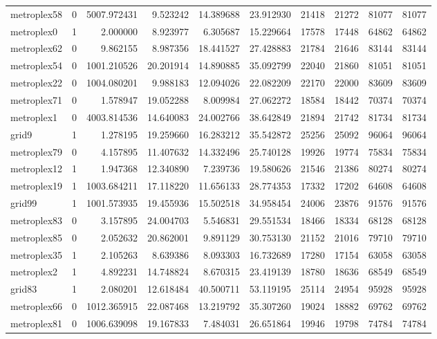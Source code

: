 \begin{longtable}{|l|r|r|r|r|r|r|r|r|r|}
metroplex58 & 0 & 5007.972431 & 9.523242 & 14.389688 & 23.912930 & 21418 & 21272 & 81077 & 81077 \\
metroplex0 & 1 & 2.000000 & 8.923977 & 6.305687 & 15.229664 & 17578 & 17448 & 64862 & 64862 \\
metroplex62 & 0 & 9.862155 & 8.987356 & 18.441527 & 27.428883 & 21784 & 21646 & 83144 & 83144 \\
metroplex54 & 0 & 1001.210526 & 20.201914 & 14.890885 & 35.092799 & 22040 & 21860 & 81051 & 81051 \\
metroplex22 & 0 & 1004.080201 & 9.988183 & 12.094026 & 22.082209 & 22170 & 22000 & 83609 & 83609 \\
metroplex71 & 0 & 1.578947 & 19.052288 & 8.009984 & 27.062272 & 18584 & 18442 & 70374 & 70374 \\
metroplex1 & 0 & 4003.814536 & 14.640083 & 24.002766 & 38.642849 & 21894 & 21742 & 81734 & 81734 \\
grid9 & 1 & 1.278195 & 19.259660 & 16.283212 & 35.542872 & 25256 & 25092 & 96064 & 96064 \\
metroplex79 & 0 & 4.157895 & 11.407632 & 14.332496 & 25.740128 & 19926 & 19774 & 75834 & 75834 \\
metroplex12 & 1 & 1.947368 & 12.340890 & 7.239736 & 19.580626 & 21546 & 21386 & 80274 & 80274 \\
metroplex19 & 1 & 1003.684211 & 17.118220 & 11.656133 & 28.774353 & 17332 & 17202 & 64608 & 64608 \\
grid99 & 1 & 1001.573935 & 19.455936 & 15.502518 & 34.958454 & 24006 & 23876 & 91576 & 91576 \\
metroplex83 & 0 & 3.157895 & 24.004703 & 5.546831 & 29.551534 & 18466 & 18334 & 68128 & 68128 \\
metroplex85 & 0 & 2.052632 & 20.862001 & 9.891129 & 30.753130 & 21152 & 21016 & 79710 & 79710 \\
metroplex35 & 1 & 2.105263 & 8.639386 & 8.093303 & 16.732689 & 17280 & 17154 & 63058 & 63058 \\
metroplex2 & 1 & 4.892231 & 14.748824 & 8.670315 & 23.419139 & 18780 & 18636 & 68549 & 68549 \\
grid83 & 1 & 2.080201 & 12.618484 & 40.500711 & 53.119195 & 25114 & 24954 & 95928 & 95928 \\
metroplex66 & 0 & 1012.365915 & 22.087468 & 13.219792 & 35.307260 & 19024 & 18882 & 69762 & 69762 \\
metroplex81 & 0 & 1006.639098 & 19.167833 & 7.484031 & 26.651864 & 19946 & 19798 & 74784 & 74784 \\

\end{longtable}
